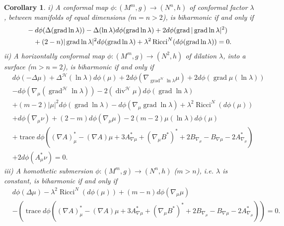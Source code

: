\documentclass[12pt]{amsart}
\theoremstyle{plain}
\newtheorem{cor}{Corollary}
\theoremstyle{definition}
\begin{document}
\begin{cor}\label{cor1}
i) A conformal map $\phi : (M^m,g) \to (N^n ,h)$ of conformal factor $\lambda$,
between manifolds of equal dimensions ($m=n > 2$), is biharmonic if and only if
\begin{align}
&- d\phi( \Delta (\operatorname{grad} \ln\lambda)) -\Delta(\ln \lambda) d\phi(\operatorname{grad} \ln \lambda) +  2 d\phi(\operatorname{grad} |\operatorname{grad} \ln \lambda|^2 )  \notag\\
& \quad + (2-n) |\operatorname{grad} \ln \lambda|^2 d\phi(\operatorname{grad} \ln \lambda)  + \lambda^2
\operatorname{Ricci}^{N}(d\phi(\operatorname{grad}\ln\lambda)) =0. \label{eqf}
\end{align}
ii) A horizontally conformal map $\phi : (M^m,g) \to (N^2 ,h)$ of dilation $\lambda$, into
a surface ($m > n=2$), is biharmonic if and only if
\begin{align*}
&d\phi(-\Delta \mu)+ \Delta^{\mathcal{H}} (\ln\lambda) d\phi(\mu) + 2 d\phi(\nabla_{\operatorname{grad}^{\mathcal{H}} \ln\lambda} \mu) + 2d\phi(\operatorname{grad} \mu(\ln\lambda)) \\
& -d\phi(\nabla_{\mu} (\operatorname{grad}^{\mathcal{H}}\ln\lambda)) -2 (\operatorname{div}^{\mathcal{H}} \mu) d\phi(\operatorname{grad} \ln\lambda)  \\
&   +(m-2) |\mu |^2 d\phi(\operatorname{grad} \ln\lambda)  - d\phi (\nabla_{\mu} \operatorname{grad} \ln\lambda) + \lambda^2\operatorname{Ricci}^{N}(d\phi(\mu)) \\
&   + d\phi(\nabla_{\mu} \nu) + (2-m) d\phi(\nabla_{\mu}\mu)  -2(m-2)\mu(\ln\lambda) d\phi(\mu)\\
&+  \operatorname{trace} d\phi( (\nabla A)^{*}_{\mu} - (\nabla A)\mu + 3A^{*}_{\nabla \mu} +
(\nabla_{\mu} B^{*})^{*} + 2 B_{\nabla_{\mu}}- B_{\nabla \mu} -2
A^{*}_{\nabla_{\mu}}) \\
&+ 2 d\phi(A^{*}_{\mu}\nu) = 0.
\end{align*}
iii) A homothetic submersion $\phi : (M^m,g) \to (N^n ,h)$ ($m>n$), i.e. $\lambda$ is
constant, is biharmonic if and only if
\begin{align*}
&d\phi(\Delta \mu) - \lambda^2 \operatorname{Ricci}^{N}(d\phi(\mu)) + (m-n) d\phi(\nabla_{\mu}\mu) \\
&- (\operatorname{trace} d\phi( (\nabla A)^{*}_{\mu} - (\nabla A)\mu + 3A^{*}_{\nabla \mu}
 + (\nabla_{\mu} B^{*})^{*} + 2 B_{\nabla_{\mu}}- B_{\nabla \mu} - 2 A^{*}_{\nabla_{\mu}} )) = 0.
\end{align*}
\end{cor}
\end{document}
